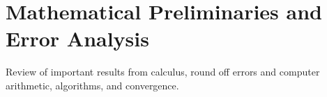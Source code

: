\chapter{Mathematical Preliminaries and Error Analysis}
Review of important results from calculus, round off errors and computer arithmetic, algorithms, and convergence.